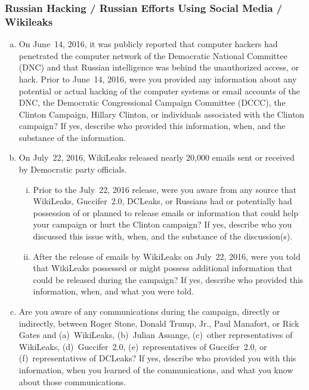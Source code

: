 \subsubsection{Russian Hacking / Russian Efforts Using Social Media / Wikileaks}

\begin{enumerate}[a.]

\item On June~14, 2016, it was publicly reported that computer hackers had penetrated the computer network of the Democratic National Committee (DNC) and that Russian intelligence was behind the unauthorized access, or hack.
Prior to June~14, 2016, were you provided any information about any potential or actual hacking of the computer systems or email accounts of the DNC, the Democratic Congressional Campaign Committee (DCCC), the Clinton Campaign, Hillary Clinton, or individuals associated with the Clinton campaign?
If yes, describe who provided this information, when, and the substance of the information.

\item On July~22, 2016, WikiLeaks released nearly 20,000 emails sent or received by Democratic party officials.

\begin{enumerate}[i.]

\item Prior to the July~22, 2016 release, were you aware from any source that WikiLeaks, Guccifer~2.0, DCLeaks, or Russians had or potentially had possession of or planned to release emails or information that could help your campaign or hurt the Clinton campaign?
If yes, describe who you discussed this issue with, when, and the substance of the discussion(s).

\item After the release of emails by WikiLeaks on July~22, 2016, were you told that WikiLeaks possessed or might possess additional information that could be released during the campaign?
If yes, describe who provided this information, when, and what you were told.

\end{enumerate}

\item Are you aware of any communications during the campaign, directly or indirectly, between Roger Stone, Donald Trump, Jr., Paul Manafort, or Rick Gates and (a)~WikiLeaks, (b)~Julian Assange, (c)~other representatives of WikiLeaks, (d)~Guccifer~2.0, (e)~representatives of Guccifer~2.0, or (f)~representatives of DCLeaks?
If yes, describe who provided you with this information, when you learned of the communications, and what you know about those communications.


\end{enumerate}
